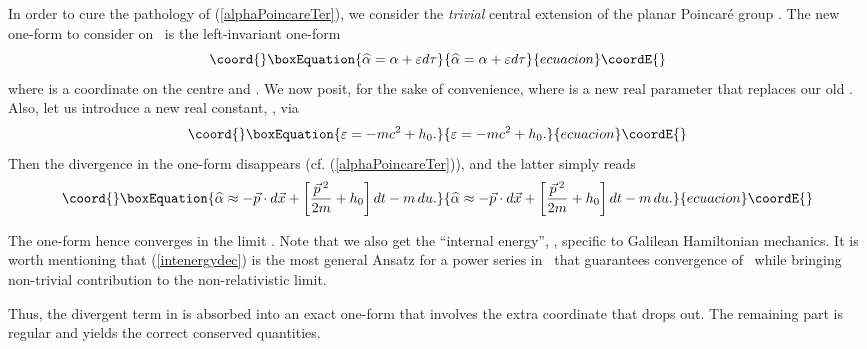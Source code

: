 \documentclass[a4paper,11pt]{article}
\providecommand{\bR}{{\bf R}}
\providecommand{\vx}{{\vec x}}
\def\vp{{\vec p}}
\def\vx{{\vec x}}
\begin{document}
In order to cure the pathology of (\ref{alphaPoincareTer}), we
consider the  {\it trivial} central extension
\myHighlight{$\widehat{G}=G\times\bR$}\coordHE{} of the planar Poincar\'e
group \coordHE{}. The new one-form to consider on~\coordHE{} is the
left-invariant one-form
\begin{equation}\coord{}\boxEquation{
\widehat{\alpha}=\alpha+\varepsilon d\tau
\label{alphahat}
}{
\widehat{\alpha}=\alpha+\varepsilon d\tau
}{ecuacion}\coordE{}\end{equation}
where \myHighlight{$\tau$}\coordHE{} is a coordinate on the centre  \myHighlight{$(\bR,+)$}\coordHE{} and
\myHighlight{$\varepsilon\in\bR$}\coordHE{}.
We now posit, for the sake of convenience,
\coordHE{}
where \coordHE{} is a new real parameter that replaces our old
\myHighlight{$\tau$}\coordHE{}. Also, let us introduce a new real constant, \coordHE{},
via
\begin{equation}\coord{}\boxEquation{
\varepsilon=-mc^2+h_0.
\label{intenergydec}
}{
\varepsilon=-mc^2+h_0.
}{ecuacion}\coordE{}\end{equation}
Then the divergence in the one-form
\myHighlight{$\widehat{\alpha}$}\coordHE{} disappears (cf. (\ref{alphaPoincareTer})),
and the latter simply reads
\begin{equation}\coord{}\boxEquation{
\widehat{\alpha}
\approx
-\vp\cdot d\vx
+\left[\frac{\vp{\,}^2}{2m}
+h_0\right]dt
-
m\,du.
\label{alphaPoincareQuarto}
}{
\widehat{\alpha}
\approx
-\vp\cdot d\vx
+\left[\frac{\vp{\,}^2}{2m}
+h_0\right]dt
-
m\,du.
}{ecuacion}\coordE{}\end{equation}

\goodbreak
The one-form \myHighlight{$\widehat{\alpha}$}\coordHE{} hence converges in the limit
\coordHE{}. Note that we also get the
``internal energy'', \coordHE{}, specific to Galilean Hamiltonian mechanics.
It is worth mentioning that (\ref{intenergydec}) is the most general
Ansatz for a power series in~\coordHE{} that guarantees convergence
of~\myHighlight{$\widehat{\alpha}$}\coordHE{} while bringing non-trivial contribution to the
non-relativistic limit.

Thus, the divergent term in \myHighlight{$\alpha$}\coordHE{} is absorbed into
an exact one-form that involves the extra coordinate that drops out.
The remaining part is regular and yields the correct conserved quantities.
\end{document}
